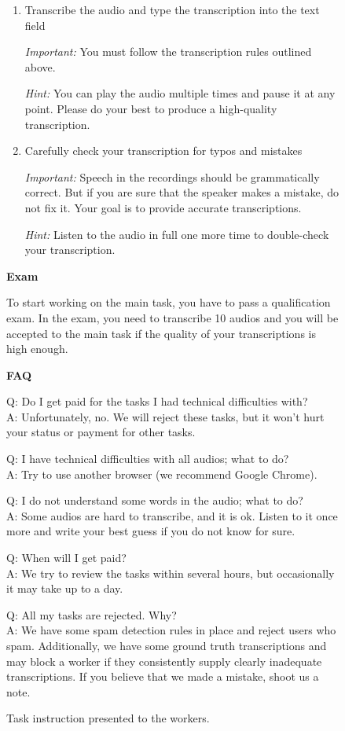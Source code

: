 \documentclass{article}
\begin{document}
\begin{figure}[htbp]
{{\begin{enumerate}
\textit{Hint:} It is best to use headphones to perform this task -- you will hear the speech better.
\item Transcribe the audio and type the transcription into the text field

\textit{Important:} You must follow the transcription rules outlined above.

\textit{Hint:} You can play the audio multiple times and pause it at any point.
Please do your best to produce a high-quality transcription.
\item Carefully check your transcription for typos and mistakes

\textit{Important:} Speech in the recordings should be grammatically correct. But if you are sure that the speaker makes a mistake, do not fix it. Your goal is to provide accurate transcriptions.

\textit{Hint:} Listen to the audio in full one more time to double-check your transcription.
\end{enumerate}

\textbf{Exam}\smallskip

To start working on the main task, you have to pass a qualification exam. In the exam, you need to transcribe 10 audios and you will be accepted to the main task if the quality of your transcriptions is high enough.

\medskip\textbf{FAQ}\smallskip

Q: Do I get paid for the tasks I had technical difficulties with?\\
A: Unfortunately, no. We will reject these tasks, but it won't hurt your status or payment for other tasks.

\smallskip

Q: I have technical difficulties with all audios; what to do?\\
A: Try to use another browser (we recommend Google Chrome).

\smallskip

Q: I do not understand some words in the audio; what to do?\\
A: Some audios are hard to transcribe, and it is ok. Listen to it once more and write your best guess if you do not know for sure.

\smallskip

Q: When will I get paid?\\
A: We try to review the tasks within several hours, but occasionally it may take up to a day.

\smallskip

Q: All my tasks are rejected. Why?\\
A: We have some spam detection rules in place and reject users who spam. Additionally, we have some ground truth transcriptions and may block a worker if they consistently supply clearly inadequate transcriptions. If you believe that we made a mistake, shoot us a note.
 }}
  \caption{Task instruction presented to the workers.}
  \label{fig:instruction}
\end{figure}
\end{document}
